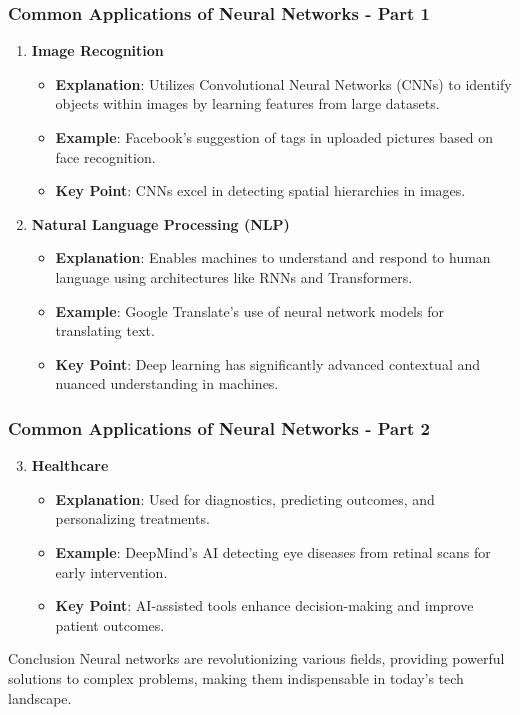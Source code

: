 \documentclass[aspectratio=169]{beamer}
\begin{document}
\begin{frame}[fragile]
    \frametitle{Common Applications of Neural Networks - Part 1}
    
    \begin{enumerate}
        \item \textbf{Image Recognition}
        \begin{itemize}
            \item \textbf{Explanation}: Utilizes Convolutional Neural Networks (CNNs) to identify objects within images by learning features from large datasets.
            \item \textbf{Example}: Facebook's suggestion of tags in uploaded pictures based on face recognition.
            \item \textbf{Key Point}: CNNs excel in detecting spatial hierarchies in images.
        \end{itemize}
        
        \item \textbf{Natural Language Processing (NLP)}
        \begin{itemize}
            \item \textbf{Explanation}: Enables machines to understand and respond to human language using architectures like RNNs and Transformers.
            \item \textbf{Example}: Google Translate’s use of neural network models for translating text.
            \item \textbf{Key Point}: Deep learning has significantly advanced contextual and nuanced understanding in machines.
        \end{itemize}
    \end{enumerate}
\end{frame}

\begin{frame}[fragile]
    \frametitle{Common Applications of Neural Networks - Part 2}

    \begin{enumerate}
        \setcounter{enumi}{2}
        \item \textbf{Healthcare}
        \begin{itemize}
            \item \textbf{Explanation}: Used for diagnostics, predicting outcomes, and personalizing treatments.
            \item \textbf{Example}: DeepMind's AI detecting eye diseases from retinal scans for early intervention.
            \item \textbf{Key Point}: AI-assisted tools enhance decision-making and improve patient outcomes.
        \end{itemize}
    \end{enumerate}

    \begin{block}{Conclusion}
        Neural networks are revolutionizing various fields, providing powerful solutions to complex problems, making them indispensable in today's tech landscape.
    \end{block}
\end{frame}
\end{document}
